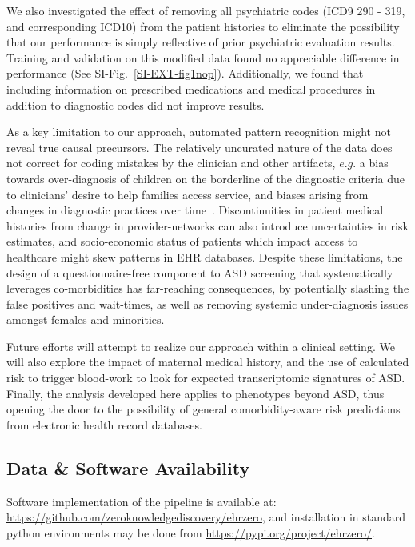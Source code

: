 \documentclass[onecolumn,,10pt]{IEEEtran}
\begin{document}
We also investigated the effect of removing all psychiatric codes (ICD9 290 - 319, and corresponding ICD10) from the patient histories to eliminate the possibility that our performance is simply reflective of prior psychiatric evaluation results. Training and validation on this modified data found  no appreciable difference in performance (See SI-Fig.~\ref{SI-EXT-fig1nop}).
Additionally, we found that including information on prescribed medications and medical procedures in addition to diagnostic codes did not improve results.

As a key limitation to our approach, automated pattern recognition  might not reveal true causal precursors. The relatively uncurated nature of the  data does not correct for coding mistakes by the clinician and other artifacts, $e.g.$   a bias towards over-diagnosis of  children on the borderline of the diagnostic criteria due to clinicians' desire to help families access service, and biases arising from changes in diagnostic practices over time~\cite{10.1001/jamapsychiatry.2019.1956}. Discontinuities in patient medical histories from change in provider-networks  can also introduce  uncertainties  in risk estimates, and socio-economic status of patients which impact access to healthcare  might skew patterns in EHR databases. Despite these limitations, the design of a questionnaire-free component to ASD screening  that systematically leverages co-morbidities  has far-reaching consequences, by potentially slashing the false positives and wait-times, as well as removing systemic under-diagnosis issues amongst females and minorities. 

Future efforts will attempt to realize our approach within a clinical setting. We will also explore the impact of  maternal medical history, and the  use of calculated risk to trigger   blood-work to look for expected  transcriptomic  signatures of ASD. Finally,  the analysis developed here applies to phenotypes beyond ASD, thus opening the door to the possibility of  general  comorbidity-aware risk predictions  from electronic health record databases.


\subsection*{Data \& Software Availability} Software implementation of the pipeline is available at: \href{https://github.com/zeroknowledgediscovery/ehrzero}{https://github.com/zeroknowledgediscovery/ehrzero}, and installation in standard python environments
may be done from \href{https://pypi.org/project/ehrzero/}{https://pypi.org/project/ehrzero/}.
\end{document}
